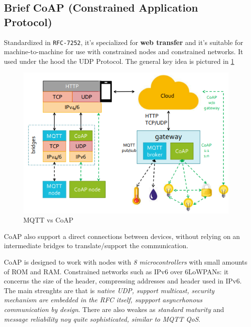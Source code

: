 \documentclass[10pt,a4paper]{report}
\theoremstyle{definition}
\begin{document}
\subsection{Brief CoAP (Constrained Application Protocol)}\label{sec:brief-coap-constrained-application-protocol}
Standardized in \texttt{RFC-7252}, it's specialized for \textbf{web transfer} and it's suitable for machine-to-machine for use with constrained nodes and constrained networks. It used under the hood the UDP Protocol. The general key idea is pictured in \ref{mqtt-vs-coap}
\begin{figure}[h]
	\centering\includegraphics[scale=0.50]{images/Pasted image 20230307113500.png}
	\caption{MQTT vs CoAP}\label{mqtt-vs-coap}\end{figure}


CoAP also support a direct connections between devices, without relying on an intermediate bridges to translate/support the communication.

CoAP is designed to work with nodes with \textit{8 microcontrollers} with small amounts of ROM and RAM.  Constrained networks such as IPv6 over 6LoWPANs: it concerns the size of the header, compressing addresses and header used in IPv6.\\
The main strenghts are that is \textit{native UDP, support multicast, security mechanism are embedded in the RFC itself, suppport asyncrhonous communication by design}. There are also weakes as \textit{standard maturity} and \textit{message reliability noy quite sophisticated, similar to MQTT QoS}.
\end{document}
